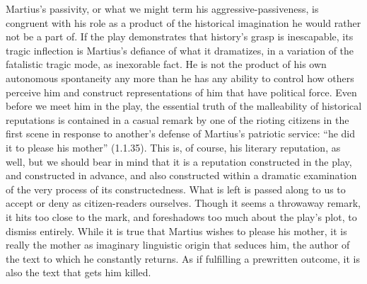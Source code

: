 Martius's passivity, or what we might term his aggressive-passiveness, is congruent with his role as a product of the historical imagination he would rather not be a part of.
If the play demonstrates that history's grasp is inescapable, its tragic inflection is Martius's defiance of what it dramatizes, in a variation of the fatalistic tragic mode, as inexorable fact.
He is not the product of his own autonomous spontaneity any more than he has any ability to control how others perceive him and construct representations of him that have political force.
Even before we meet him in the play, the essential truth of the malleability of historical reputations is contained in a casual remark by one of the rioting citizens in the first scene in response to another's defense of Martius's patriotic service: ``he did it to please his mother'' (1.1.35).
This is, of course, his literary reputation, as well, but we should bear in mind that it is a reputation constructed in the play, and constructed in advance, and also constructed within a dramatic examination of the very process of its constructedness.
What is left is passed along to us to accept or deny as citizen-readers ourselves.
Though it seems a throwaway remark, it hits too close to the mark, and foreshadows too much about the play's plot, to dismiss entirely.
While it is true that Martius wishes to please his mother, it is really the mother as imaginary linguistic origin that seduces him, the author of the text to which he constantly returns.
As if fulfilling a prewritten outcome, it is also the text that gets him killed.

